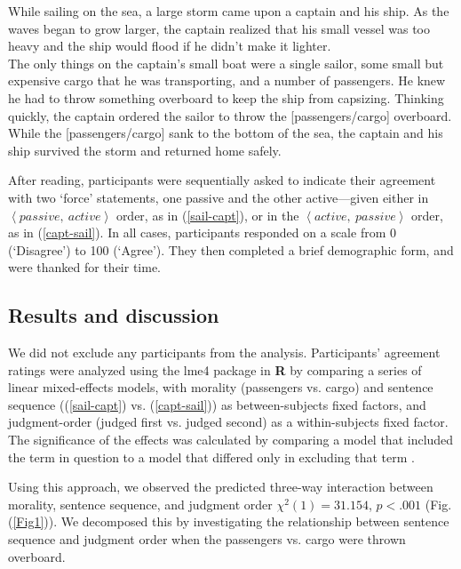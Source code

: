 \documentclass{salt}
\newcommand{\seq}[1]{\left\langle {#1} \right\rangle}
\newcommand{\reff}[1]{(\ref{#1})}
\begin{document}
\begin{exe}\ex While sailing on the sea, a large storm came upon a captain and his ship. As the waves began to grow larger, the captain realized that his small vessel was too heavy and the ship would flood if he didn't make it lighter. \\ \hspace*{.5cm}The only things on the captain's small boat were a single sailor, some small but expensive cargo that he was transporting, and a number of passengers. He knew he had to throw something overboard to keep the ship from capsizing. Thinking quickly, the captain ordered the sailor to throw the [passengers/cargo] overboard. While the [passengers/cargo] sank to the bottom of the sea, the captain and his ship survived the storm and returned home safely.\end{exe}

\noindent After reading, participants were sequentially asked to indicate their agreement with two `force' statements, one passive and the other active---given either in $\seq{passive,~ active}$ order, as in \reff{sail-capt},  or in the $\seq{active,~ passive}$ order, as in \reff{capt-sail}. In all cases, participants responded on a scale from 0 (`Disagree') to 100 (`Agree'). They then completed a brief demographic form, and were thanked for their time.

\subsection{Results and discussion}

We did not exclude any participants from the analysis. Participants' agreement ratings were analyzed using the lme4 package in \textbf{\textsf{R}} \citep{bates2014lme4} by comparing a series of linear mixed-effects models, with morality (passengers vs. cargo) and sentence sequence (\reff{sail-capt} vs. \reff{capt-sail}) as between-subjects fixed factors, and judgment-order (judged first vs. judged second) as a within-subjects fixed factor. The significance of the effects was calculated by comparing a model that included the term in question to a model that differed only in excluding that term \citep{barr2013random}.

Using this approach, we observed the predicted three-way interaction between morality, sentence sequence, and judgment order $\chi^2(1)= 31.154$, $p < .001$ (Fig. \reff{Fig1}). We decomposed this by investigating the relationship between sentence sequence and judgment order when the passengers vs. cargo were thrown overboard.
\end{document}
